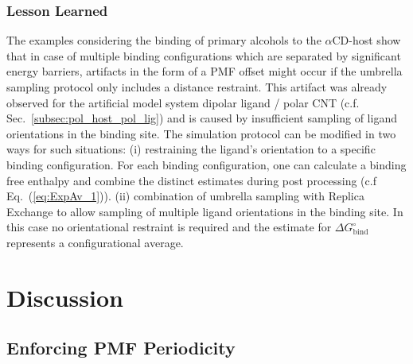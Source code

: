\documentclass[9pt,lessons,pubversion]{livecoms}
\begin{document}
\subsubsection*{Lesson Learned}

The examples considering the binding of primary alcohols to the $\alpha$CD-host show that in case of multiple binding configurations which are separated by significant energy barriers, 
artifacts in the form of a PMF offset might occur if the umbrella sampling protocol only includes a distance restraint.
This artifact was already observed for the artificial model system dipolar ligand / polar CNT (c.f. Sec.~\ref{subsec:pol_host_pol_lig}) and is caused by insufficient sampling of ligand orientations in the binding site. 
The  simulation protocol can be modified in two ways for such situations: 
(i) restraining the ligand's orientation to a specific binding configuration. 
For each binding configuration, one can calculate a binding free enthalpy and combine the distinct estimates during post processing (c.f Eq.~(\ref{eq:ExpAv_1})).
(ii) combination of umbrella sampling with Replica Exchange to allow sampling of multiple ligand orientations in the binding site. 
In this case no orientational restraint is required and the estimate for $\Delta G^\circ_\mathrm{bind}$ represents a configurational average.

\section{Discussion}

\subsection{Enforcing PMF Periodicity}
\end{document}
